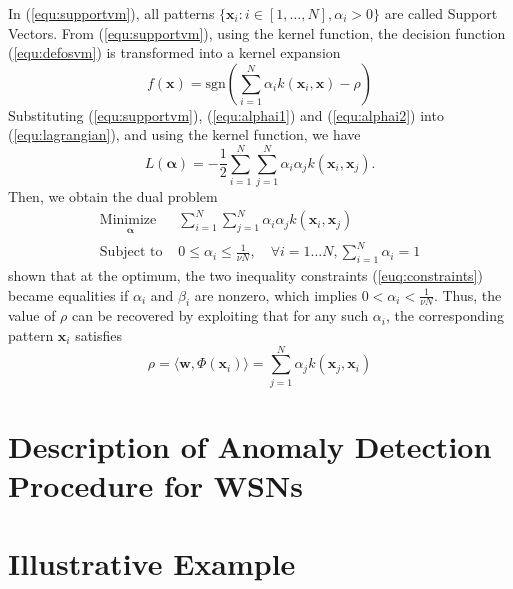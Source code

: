 \documentclass[conference]{IEEEtran}
\theoremstyle{problemstyle}
\begin{document}
In (\ref{equ:supportvm}), all patterns $\{\mathbf{x}_i:i\in[1,\ldots,N], \alpha_i>0\}$ are called Support Vectors. From (\ref{equ:supportvm}), using the kernel function, the decision function (\ref{equ:defosvm}) is transformed into a kernel expansion 
\begin{equation}
\label{equ:defosvmker}
f(\mathbf{x})=\text{sgn}\left(\sum_{i=1}^N\alpha_i k(\mathbf{x}_i, \mathbf{x})- \rho\right)
\end{equation}
Substituting (\ref{equ:supportvm}), (\ref{equ:alphai1}) and (\ref{equ:alphai2}) into (\ref{equ:lagrangian}), and using the kernel function, we have 
\begin{equation}
\label{equ:lagrangianalpha}
L(\boldsymbol{\alpha})=-\frac{1}{2}\sum_{i=1}^N\sum_{j=1}^N \alpha_i\alpha_j k(\mathbf{x}_i, \mathbf{x}_j).
\end{equation}
Then, we obtain the dual problem
\begin{subequations}\label{euq:ocsvmker}
\begin{align}
\underset{
	\begin{array}{c}
		 \mathbf{\alpha}
	\end{array}}{\text{Minimize }} & \sum_{i=1}^N\sum_{j=1}^N \alpha_i\alpha_j k(\mathbf{x}_i, \mathbf{x}_j)\\
\text{Subject to } & 0\leq \alpha_i\leq \frac{1}{\nu N}, \quad \forall i=1\ldots N, \sum_{i=1}^N\alpha_i=1 
\end{align}
\end{subequations}
\cite{scholkopf2001estimating} shown that at the optimum, the two inequality constraints (\ref{euq:constraints}) 
became equalities if $\alpha_i$ and $\beta_i$ are nonzero, which implies $0<\alpha_i<\frac{1}{\nu N}$. Thus, the value of $\rho$
can be recovered by exploiting that for any such $\alpha_i$, the corresponding pattern $ \mathbf{x}_i$ satisfies
\begin{equation}
\label{equ:rho}
\rho=\langle\mathbf{w},\Phi(\mathbf{x}_i)\rangle=\sum_{j=1}^N\alpha_j k(\mathbf{x}_j, \mathbf{x}_i)
\end{equation}

\section{Description of Anomaly Detection Procedure for WSNs}



\section{Illustrative Example}\label{sec:Illustrative}
\end{document}
